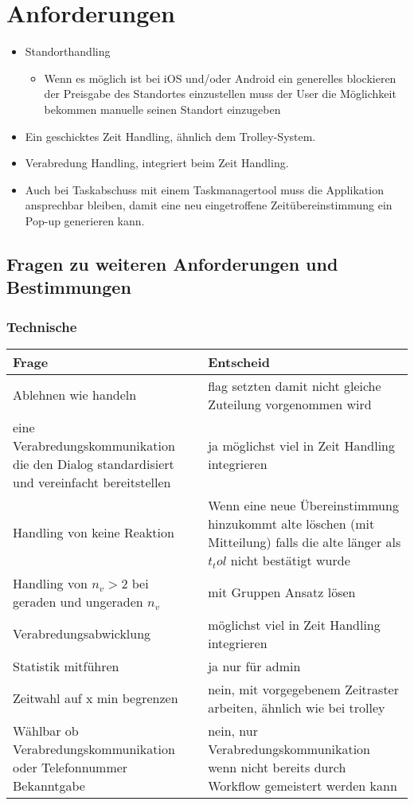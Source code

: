 
\section{Anforderungen}

\begin{itemize}
\item Standorthandling
\begin{itemize}
\item Wenn es möglich ist bei iOS und/oder Android ein generelles blockieren der Preisgabe des Standortes einzustellen muss der User die Möglichkeit bekommen manuelle seinen Standort einzugeben
\end{itemize}
\item Ein geschicktes Zeit Handling, ähnlich dem Trolley-System.
\item Verabredung Handling, integriert beim Zeit Handling.
\item Auch bei Taskabschuss mit einem Taskmanagertool muss die Applikation ansprechbar bleiben, damit eine neu eingetroffene Zeitübereinstimmung ein Pop-up generieren kann.
\end{itemize}




\subsection{Fragen zu weiteren Anforderungen und Bestimmungen}

\subsubsection{Technische}

\begin{tabularx}{\textwidth}{X|X}
Frage & Entscheid \\\hline
Ablehnen wie handeln & flag setzten damit nicht gleiche Zuteilung vorgenommen wird\\\hline
eine Verabredungskommunikation die den Dialog standardisiert und vereinfacht bereitstellen & ja möglichst viel in Zeit Handling integrieren\\\hline
Handling von keine Reaktion & Wenn eine neue Übereinstimmung hinzukommt alte löschen (mit Mitteilung) falls die alte länger als $t_tol$ nicht bestätigt wurde\\\hline
Handling von $n_v>2$ bei geraden und ungeraden $n_v$ & mit Gruppen Ansatz lösen \\\hline
Verabredungsabwicklung & möglichst viel in Zeit Handling integrieren\\\hline
Statistik mitführen & ja nur für admin\\\hline
Zeitwahl auf x min begrenzen & nein, mit vorgegebenem Zeitraster arbeiten, ähnlich wie bei trolley\\\hline
Wählbar ob Verabredungskommunikation oder Telefonnummer Bekanntgabe & nein, nur Verabredungskommunikation wenn nicht bereits durch Workflow gemeistert werden kann\\
\end{tabularx}


